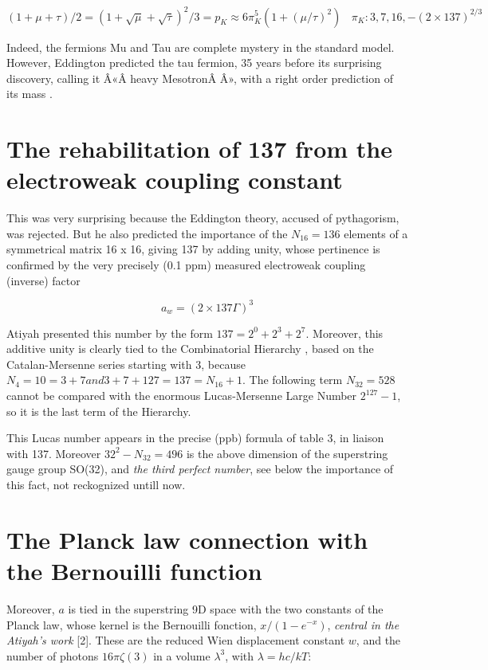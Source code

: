 \documentclass[a4paper,9pt]{article}
\begin{document}
\begin{equation}
(1 + \mu + \tau)/2 = (1 + \sqrt{\mu} + \sqrt{\tau})^2/3 = p_K \approx 6\pi_K^5 (1+(\mu / \tau)^2) ~~~~\pi_K: 3,7,16,-(2\times 137)^{2/3}
\end{equation}

Indeed, the fermions Mu and Tau are complete mystery in the standard model. However, Eddington predicted the tau fermion, 35 years before its surprising discovery, calling it Â«Â heavy MesotronÂ Â», with a right order prediction of its mass \cite{Eddington}.

\section{The rehabilitation of 137 from the electroweak coupling constant}

 This was very surprising because the Eddington theory, accused of pythagorism, was rejected. But he also predicted the importance of the $N_16 = 136$ elements of a symmetrical matrix 16 x 16, giving 137 by adding unity, whose pertinence is confirmed by the very precisely (0.1 ppm) measured electroweak coupling (inverse) factor 

\begin{equation}
a_w = (2\times137 \Gamma)^3
\end{equation}
 
Atiyah presented this number by the form $137 = 2^0 + 2^3 + 2^7$. Moreover, this additive unity is clearly tied to the Combinatorial Hierarchy \cite{Bastin}, based on the Catalan-Mersenne series starting with 3, because $N_4 = 10 = 3 + 7 and 3+7 + 127 = 137 = N_16 + 1$. The following term $N_32  = 528$ cannot be compared with the enormous Lucas-Mersenne Large Number $2^{127}- 1$, so it is the last term of the Hierarchy. 

This Lucas number appears in the precise (ppb) formula of table 3, in liaison with 137. Moreover $32^2 - N_32 =  496$ is the above dimension of the superstring gauge group SO(32), and \textit {the third perfect number}, see below the importance of this fact, not reckognized untill now.




\section{The Planck law connection with the Bernouilli function}

 Moreover, $a$ is tied in the superstring 9D space with the two constants of the Planck law, whose kernel is the Bernouilli fonction, $x/(1-e^{-x})$, \textit {central in the Atiyah's work} [2]. These are the reduced Wien displacement constant $w$, and the number of photons $16\pi \zeta(3)$ in a volume $\lambda^3$, with $\lambda = hc/kT $:
\end{document}
